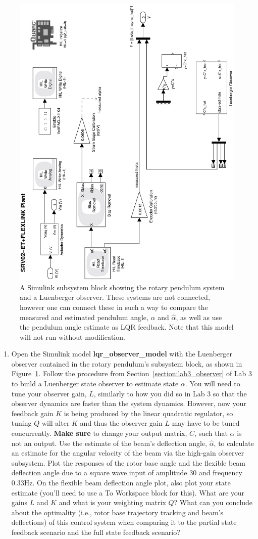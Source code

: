 \begin{enumerate}
          \begin{figure}[htb!]
              \centering
              \includegraphics[width=0.6\linewidth,angle=-90]{eps/lab_4/lqr_observer_model}
              \caption{A Simulink subsystem block showing the rotary pendulum system and a Luenberger observer. These systems are not connected, however one can connect these in such a way to compare the measured and estimated pendulum angle, $\alpha$ and $\hat{\alpha}$, as well as use the pendulum angle estimate as LQR feedback. Note that this model will not run without modification.}
              \label{figure:lab4_lqr_observer_model}
          \end{figure}
          \newpage
          \begin{enumerate}
              \item Open the Simulink model \textbf{lqr\_observer\_model} with the Luenberger observer contained in the rotary pendulum's subsystem block, as shown in Figure~\ref{figure:lab4_lqr_observer_model}. Follow the procedure from Section~\ref{section:lab3_observer} of Lab 3 to build a Luenberger state observer to estimate state $\alpha$. You will need to tune your observer gain, $L$, similarly to how you did so in Lab 3 so that the observer dynamics are faster than the system dynamics. However, now your feedback gain $K$ is being produced by the linear quadratic regulator, so tuning $Q$ will alter $K$ and thus the observer gain $L$ may have to be tuned concurrently. \textbf{Make sure} to change your output matrix, $C$, such that $\alpha$ is not an output. Use the estimate of the beam's deflection angle, $\hat{\alpha}$, to calculate an estimate for the angular velocity of the beam via the high-gain observer subsystem. Plot the responses of the rotor base angle and the flexible beam deflection angle due to a square wave input of amplitude 30 and frequency 0.33Hz. On the flexible beam deflection angle plot, also plot your state estimate (you'll need to use a To Workspace block for this). What are your gains $L$ and $K$ and what is your weighting matrix $Q$? What can you conclude about the optimality (i.e., rotor base trajectory tracking and beam's deflections) of this control system when comparing it to the partial state feedback scenario and the full state feedback scenario?

\end{enumerate}
\end{enumerate}
